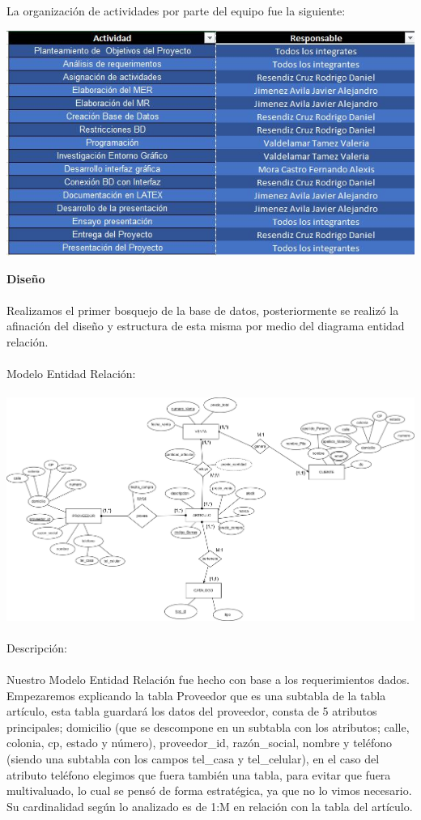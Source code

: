 \documentclass[letter,12pt]{article} %
\begin{document}
La organización de actividades por parte del equipo fue la siguiente:
\begin{center} 
\includegraphics[scale=0.95]{imagenes/DA.JPG}
\end{center}
\newpage
\large{ \textbf{Diseño}}
\\\\
Realizamos el primer bosquejo de la base de datos, posteriormente se realizó la afinación del diseño y estructura de esta misma por medio del diagrama entidad relación.
\\\\
Modelo Entidad Relaci\'on:
\\\\
\includegraphics[scale=0.17]{imagenes/MER.png}
\\\\
Descripción:
\\\\
Nuestro Modelo Entidad Relación fue hecho con base a los requerimientos dados. Empezaremos explicando la tabla Proveedor que es una subtabla de la tabla artículo, esta tabla guardará los datos del proveedor, consta de 5 atributos principales; domicilio (que se descompone en un subtabla con los atributos; calle, colonia, cp, estado y número), proveedor\_id, razón\_social, nombre y teléfono (siendo una subtabla con los campos tel\_casa y tel\_celular), en el caso del atributo teléfono elegimos que fuera también una tabla, para evitar que fuera multivaluado, lo cual se pensó de forma estratégica, ya que no lo vimos necesario. Su cardinalidad según lo analizado es de 1:M en relación con la tabla del artículo.
\end{document}
